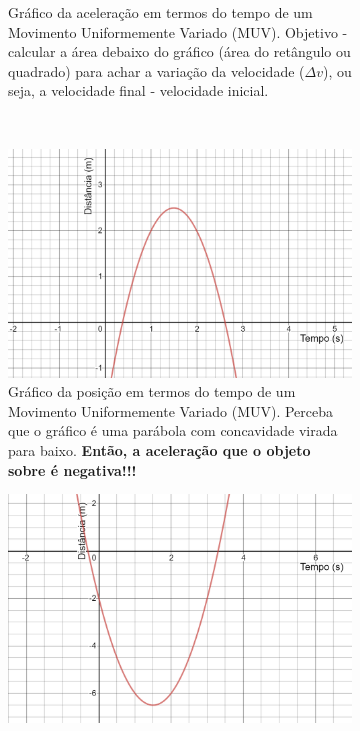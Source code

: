 \documentclass[12pt]{extarticle}
\newcommand{\<}{\langle}
\renewcommand{\>}{\rangle}
\theoremstyle{definition}
\begin{document}
\begin{itemize}
\begin{figure}[H]
\begin{subfigure}[b]{0.4\textwidth}
         \caption{Gráfico da aceleração em termos do tempo de um Movimento Uniformemente Variado (MUV). Objetivo - calcular a área debaixo do gráfico (área do retângulo ou quadrado) para achar a variação da velocidade ($\Delta v$), ou seja, a velocidade final - velocidade inicial.}
         \label{fig:MRU_pos}
     \end{subfigure}
     \\
     \begin{subfigure}[b]{0.4\textwidth}
         \centering
         \includegraphics[width=\textwidth]{pos_a_neg.png}
         \caption{Gráfico da posição em termos do tempo de um Movimento Uniformemente Variado (MUV). Perceba que o gráfico é uma parábola com concavidade virada para baixo. \textbf{Então, a aceleração que o objeto sobre é negativa!!!}}
         \label{fig:MUV_pos_a<0}
     \end{subfigure}
     \hfill
     \begin{subfigure}[b]{0.4\textwidth}
         \centering
         \includegraphics[width=\textwidth]{pos_a_pos.png}

\end{subfigure}
\end{figure}
\end{itemize}
\end{document}
